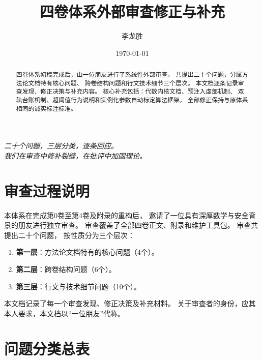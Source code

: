 \documentclass[11pt,a4paper]{article}
\title{四卷体系外部审查修正与补充}
\author{李龙胜}
\date{\today}
\begin{document}
\maketitle

\begin{center}
\textit{
二十个问题，三层分类，逐条回应。\\
我们在审查中修补裂缝，在批评中加固理论。\\
}
\end{center}

\vspace{5mm}

\begin{abstract}
四卷体系初稿完成后，由一位朋友进行了系统性外部审查，
共提出二十个问题，分属方法论文档特有核心问题、
跨卷结构问题和行文技术细节三个层次。
本文档逐条记录审查发现、修正决策与补充内容。
核心补充包括：代数内核文档、预注入虚部机制、
双轨台账机制、超阈值行为说明和实例化参数自动标定算法框架。
全部修正保持与原体系相同的诚实标注标准。
\end{abstract}

\tableofcontents

\section{审查过程说明}

本体系在完成第0卷至第4卷及附录的重构后，
邀请了一位具有深厚数学与安全背景的朋友进行独立审查。
审查覆盖了全部四卷正文、附录和维护工具包。
审查共提出二十个问题，
按性质分为三个层次：
\begin{enumerate}[label=(\arabic*)]
    \item \textbf{第一层}：方法论文档特有的核心问题（4个）。
    \item \textbf{第二层}：跨卷结构问题（6个）。
    \item \textbf{第三层}：行文与技术细节问题（10个）。
\end{enumerate}

本文档记录了每一个审查发现、修正决策及补充材料。
关于审查者的身份，应其本人要求，本文档以“一位朋友”代称。

\section{问题分类总表}
\end{document}
